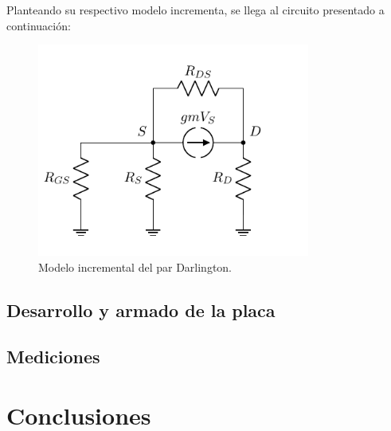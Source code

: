 Planteando su respectivo modelo incrementa, se llega al circuito presentado a continuación: 
\begin{figure}[H]
\centering
	\includegraphics[width=0.8\textwidth, page=3]{Imagenes/ModeloIncremental.pdf}
	\caption{Modelo incremental del par Darlington.}
\label{fig:incdar}
\end{figure}

\subsection{Desarrollo y armado de la placa}

\subsection{Mediciones}

\section{Conclusiones}
	
